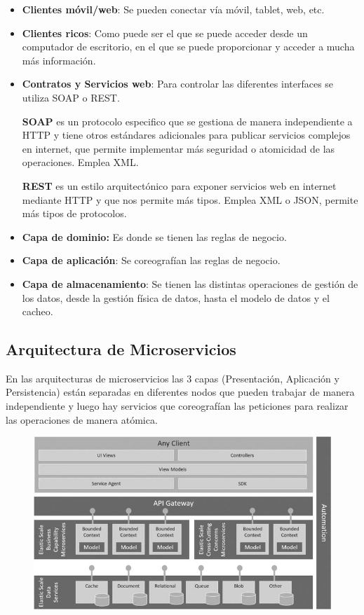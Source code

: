 \documentclass[12pt]{report} %
\begin{document}
\begin{itemize}
	\item \textbf{Clientes móvil/web}: Se pueden conectar vía móvil, tablet, web, etc.
	\item \textbf{Clientes ricos}: Como puede ser el que se puede acceder desde un computador de escritorio, en el que se puede proporcionar y acceder a mucha más información.
	\item \textbf{Contratos y Servicios web}: Para controlar las diferentes interfaces se utiliza SOAP o REST.
	
	\textbf{SOAP} es un protocolo especifico que se gestiona de manera independiente a HTTP y tiene otros estándares adicionales para publicar servicios complejos en internet, que permite implementar más seguridad o atomicidad de las operaciones. Emplea XML.

	\textbf{REST} es un estilo arquitectónico para exponer servicios web en internet mediante HTTP y que nos permite más tipos. Emplea XML o JSON, permite más tipos de protocolos.

	\item \textbf{Capa de dominio:} Es donde se tienen las reglas de negocio.
	\item \textbf{Capa de aplicación}: Se coreografían las reglas de negocio.
	\item \textbf{Capa de almacenamiento}: Se tienen las distintas operaciones de gestión de los datos, desde la gestión física de datos, hasta el modelo de datos y el cacheo.
\end{itemize}

\pagebreak
\subsection{Arquitectura de Microservicios}
En las arquitecturas de microservicios las 3 capas (Presentación, Aplicación y Persistencia) están separadas en diferentes nodos que pueden trabajar de manera independiente y luego hay servicios que coreografían las peticiones para realizar las operaciones de manera atómica.

\begin{figure}[H]
	{\includegraphics[scale=.8]{9781484212769_Fig03-03.jpg}}
\end{figure}
\end{document}
